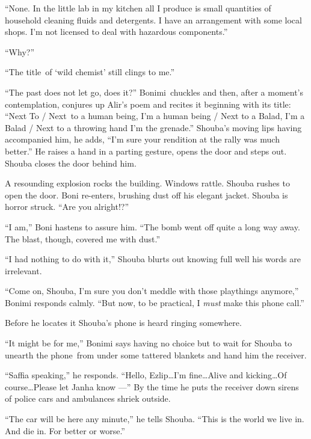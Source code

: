 \documentclass[twoside,11pt,openany]{book}
\begin{document}
``None. In the little lab in my kitchen all I produce is small quantities of household cleaning fluids and
detergents. I have an arrangement with some local shops. I'm not licensed to deal with hazardous
components.''

``Why?''

``The title~of {}`wild chemist' still clings to me.''

``The past does not let go, does it?'' Bonimi~chuckles and then, after a moment's
contemplation, conjures up Alir's poem and recites it beginning with its title: ``Next To / Next~to a
human being, I'm a human being / Next to a Balad, I'm a Balad / Next to a throwing hand I'm the grenade.''
Shouba's moving lips having accompanied him, he adds, ``I'm sure your rendition at the rally was much
better.'' He raises a hand in a parting gesture, opens the door and steps out. Shouba closes the door
behind him.

A resounding explosion rocks the building. Windows rattle. Shouba rushes to open the door. Boni re-enters, brushing dust
off his elegant jacket. Shouba is horror struck. ``Are you alright!?''

``I am,'' Boni hastens to assure him. {}``The bomb went off quite a long way away. The blast, though,
covered me with dust.''

``I had nothing to do with it,'' Shouba blurts out knowing full well his words are irrelevant.

``Come on, Shouba, I'm sure you don't meddle with those playthings anymore,'' Bonimi responds
calmly.  ``But now, to be practical, I \textit{must }make this phone call.''

 Before he locates it Shouba's phone is heard ringing somewhere.

``It might be for me,'' Bonimi says having no choice but to wait for Shouba to unearth the
phone~from under some tattered{ }blankets and hand him the receiver.

``Saffia speaking,'' he responds. ``Hello, Ezlip{\ldots}I'm fine{\ldots}Alive and
kicking{\ldots}Of course{\ldots}Please let Janha know ---'' By the time he puts the receiver down sirens of
police cars and ambulances shriek outside.

``The car will be here any minute,'' he tells Shouba. ``This is the world we live
in. And die in. For better or worse.''


\bigskip

\chapter{}
\end{document}
